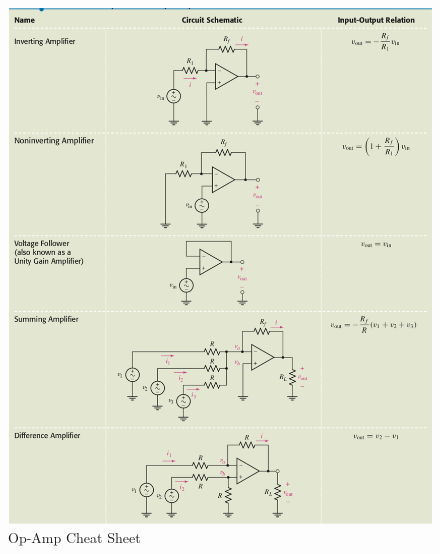 \documentclass[12pt]{article}
\begin{document}
\begin{figure}[htbp]
  \centering
  \includegraphics[scale=0.75]{OPAMP}
  \caption{Op-Amp Cheat Sheet}
\end{figure}
\end{document}
